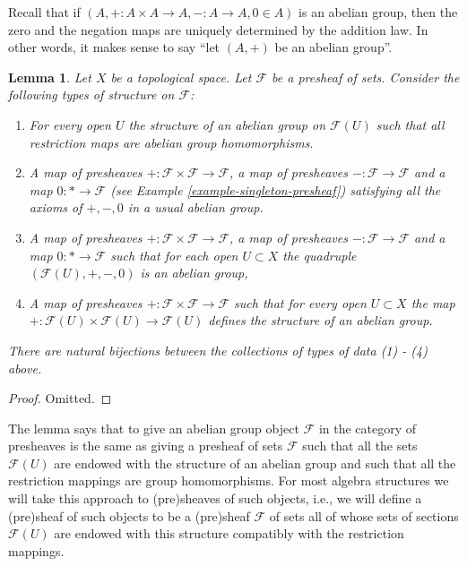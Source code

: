 \documentclass{stacks-project}
\theoremstyle{plain}
\newtheorem{lemma}[subsection]{Lemma}
\theoremstyle{definition}
\theoremstyle{remark}
\numberwithin{equation}{subsection}
\begin{document}
\noindent
Recall that if $(A, + : A \times A \to A, - : A \to A, 0\in A)$
is an abelian group, then the zero and the negation maps are
uniquely determined by the addition law. In other words, it
makes sense to say ``let $(A, +)$ be an abelian group''.

\begin{lemma}
\label{lemma-abelian-presheaves}
Let $X$ be a topological space.
Let $\mathcal{F}$ be a presheaf of sets.
Consider the following types of structure on $\mathcal{F}$:
\begin{enumerate}
\item For every open $U$ the structure of an abelian group
on $\mathcal{F}(U)$ such that all restriction maps are
abelian group homomorphisms.
\item A map of presheaves
$+ : \mathcal{F} \times \mathcal{F} \to \mathcal{F}$,
a map of presheaves $- : \mathcal{F} \to \mathcal{F}$
and a map $0 : * \to \mathcal{F}$
(see Example \ref{example-singleton-presheaf})
satisfying all the axioms of $+, -, 0$ in a usual
abelian group.
\item A map of presheaves
$+ : \mathcal{F} \times \mathcal{F} \to \mathcal{F}$,
a map of presheaves $- : \mathcal{F} \to \mathcal{F}$
and a map $0 : * \to \mathcal{F}$
such that for each open $U \subset X$ the quadruple
$(\mathcal{F}(U), +, -, 0)$ is an abelian group,
\item A map of presheaves $+ : \mathcal{F} \times \mathcal{F}
\to \mathcal{F}$ such that for every open $U \subset X$
the map $+ : \mathcal{F}(U) \times \mathcal{F}(U) \to \mathcal{F}(U)$
defines the structure of an abelian group.
\end{enumerate}
There are natural bijections between the collections of
types of data (1) - (4) above.
\end{lemma}

\begin{proof}
Omitted.
\end{proof}

\noindent
The lemma says that to give an abelian group object $\mathcal{F}$
in the category of presheaves is the same as giving a presheaf of sets
$\mathcal{F}$ such that all the sets $\mathcal{F}(U)$ are endowed
with the structure of an abelian group and such that all the restriction
mappings are group homomorphisms. For most algebra structures
we will take this approach to (pre)sheaves of such objects, i.e.,
we will define a (pre)sheaf of such objects to be a (pre)sheaf
$\mathcal{F}$ of sets all of whose sets of sections $\mathcal{F}(U)$
are endowed with this structure compatibly with the restriction
mappings.
\end{document}
